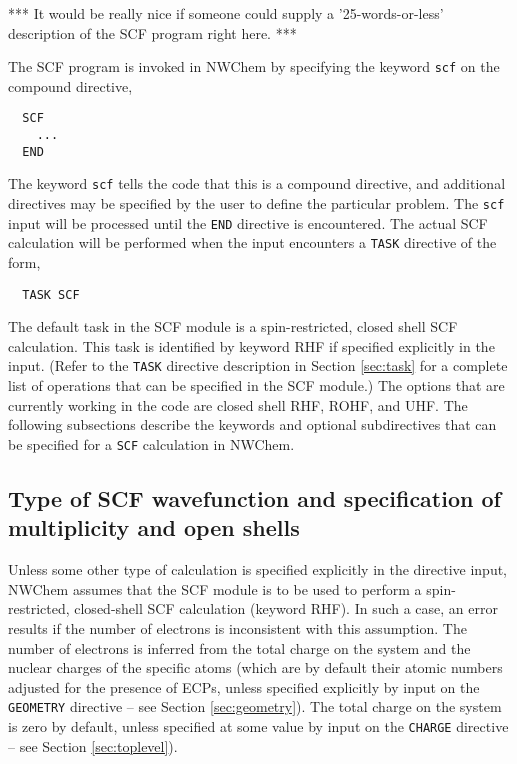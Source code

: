 \label{SCF}
\Large
***
It would be really nice if someone could supply a '25-words-or-less'
description of the SCF program right here.
***
\normalsize

The SCF program is invoked in NWChem 
by specifying the keyword \verb+scf+ on the compound directive,

\begin{verbatim}
  SCF
    ...
  END
\end{verbatim}

The keyword \verb+scf+ tells the code that this is a compound directive,
and additional directives may be specified by the user to define the particular
problem.  The \verb+scf+ input will be processed until the
\verb+END+ directive is encountered.  The actual SCF calculation will
be performed when the input encounters a \verb+TASK+ directive of the form,

\begin{verbatim}
  TASK SCF
\end{verbatim}

The default task in the SCF module is a spin-restricted, 
closed shell SCF calculation.  This task is identified by keyword RHF if specified 
explicitly in the input.  (Refer to the \verb+TASK+ directive description in
Section \ref{sec:task} for a complete list of operations that can be
specified in the SCF module.)  The options that are currently working
in the code are closed shell RHF, ROHF, and UHF. The following 
subsections describe the keywords and
optional subdirectives that can be specified for a \verb+SCF+ calculation
in NWChem.


\subsection{Type of SCF wavefunction and specification of multiplicity
and open shells}

Unless some other type of calculation is specified explicitly in
the directive input, NWChem assumes that the SCF module is to be used
to perform a spin-restricted,
closed-shell SCF calculation (keyword RHF).  In such a case, an error results
if the number of electrons is inconsistent with this assumption.
The number of electrons is inferred from the
total charge on the system and the nuclear charges of the
specific atoms (which are by default their atomic numbers
adjusted for the presence of ECPs, unless specified
explicitly by input on the \verb+GEOMETRY+ directive -- see Section 
\ref{sec:geometry}).  The total charge on the system is zero by default, 
unless specified at
some value by input on the \verb+CHARGE+ directive -- see Section 
\ref{sec:toplevel}).

